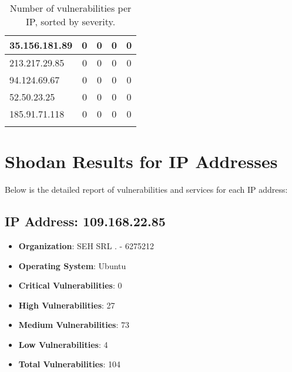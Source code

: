 \documentclass{article}
\begin{document}
\begin{longtable}{|>{\raggedright\arraybackslash}p{3cm}|c|c|c|c|}
    
    \rowcolor{lightgreen} %
    
    35.156.181.89 & 0 & 0 & 0 & 0 \\
    \hline
    
    
    \rowcolor{lightgreen} %
    
    213.217.29.85 & 0 & 0 & 0 & 0 \\
    \hline
    
    
    \rowcolor{lightgreen} %
    
    94.124.69.67 & 0 & 0 & 0 & 0 \\
    \hline
    
    
    \rowcolor{lightgreen} %
    
    52.50.23.25 & 0 & 0 & 0 & 0 \\
    \hline
    
    
    \rowcolor{lightgreen} %
    
    185.91.71.118 & 0 & 0 & 0 & 0 \\
    \hline
    
    \caption{Number of vulnerabilities per IP, sorted by severity.} \\
\end{longtable}

\clearpage

\section{Shodan Results for IP Addresses}

Below is the detailed report of vulnerabilities and services for each IP address:






\subsection{IP Address: 109.168.22.85}

\begin{itemize}
    \item \textbf{Organization}: SEH SRL . - 6275212
    \item \textbf{Operating System}:  Ubuntu 
    \item \textbf{Critical Vulnerabilities}: 0
    \item \textbf{High Vulnerabilities}: 27
    \item \textbf{Medium Vulnerabilities}: 73
    \item \textbf{Low Vulnerabilities}: 4
    \item \textbf{Total Vulnerabilities}: 104
\end{itemize}
\end{document}

